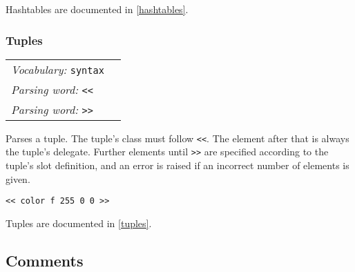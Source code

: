 \documentclass{book}
\newcommand{\vocabulary}[1]{\emph{Vocabulary:} \texttt{#1}&\\}
\newcommand{\parsingword}[2]{\index{\texttt{#1}}\emph{Parsing word:} \texttt{#2}&\\}
\newcommand{\wordtable}[1]{

\begin{tabularx}{12cm}[t]{lX}
\hline
#1
\hline
\end{tabularx}

}
\begin{document}
Hashtables are documented in \ref{hashtables}.

\subsubsection{Tuples}
\newcommand{\tupleglos}{}
\tupleglos
\wordtable{
\vocabulary{syntax}
\parsingword{<<}{<<}
\parsingword{>>}{>>}
}
Parses a tuple. The tuple's class must follow \texttt{<<}. The element after that is always the tuple's delegate. Further elements until \texttt{>>} are specified according to the tuple's slot definition, and an error is raised if an incorrect number of elements is given.
\begin{verbatim}
<< color f 255 0 0 >>
\end{verbatim}

Tuples are documented in \ref{tuples}.

\subsection{\label{comments}Comments}
\end{document}
